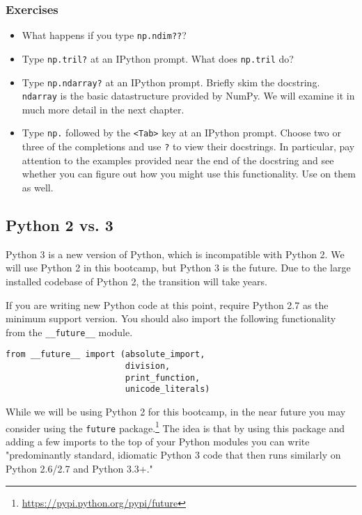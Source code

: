 \subsubsection{Exercises}
\begin{itemize}
\item What happens if you type \texttt{np.ndim??}?
\item Type \texttt{np.tril?} at an IPython prompt. What does \texttt{np.tril} do?
\item Type \texttt{np.ndarray?} at an IPython prompt. Briefly skim the docstring.
  \texttt{ndarray} is the basic datastructure provided by NumPy. We will examine it
  in much more detail in the next chapter.
\item Type \texttt{np.} followed by the \texttt{<Tab>} key at an IPython prompt.
  Choose two or three of the completions and use \texttt{?} to view their
  docstrings.  In particular, pay attention to the examples provided near
  the end of the docstring and see whether you can figure out how you might
  use this functionality.  Use on them as well.
\end{itemize}

\subsection{Python 2 vs. 3}

Python 3 is a new version of Python, which is incompatible with Python 2.
We will use Python 2 in this bootcamp, but Python 3 is the future.  Due
to the large installed codebase of Python 2, the transition will take years.

If you are writing new Python code at this point, require Python 2.7 as the
minimum support version.  You should also import the following functionality
from the \texttt{\_\_future\_\_} module.

\begin{verbatim}
from __future__ import (absolute_import,
                        division,
                        print_function,
                        unicode_literals)
\end{verbatim}

While we will be using Python 2 for this bootcamp, in the near future you may
consider using the \texttt{future}
package.\footnote{\url{https://pypi.python.org/pypi/future}} The idea is that
by using this package and adding a few imports to the top of your Python
modules you can write "predominantly standard, idiomatic Python 3 code that
then runs similarly on Python 2.6/2.7 and Python 3.3+."


